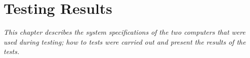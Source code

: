 \chapter{Testing Results} \label{chap:results}
\textit{This chapter describes the system specifications of the two computers that were used during testing; how to tests were carried out and present the results of the tests.}






